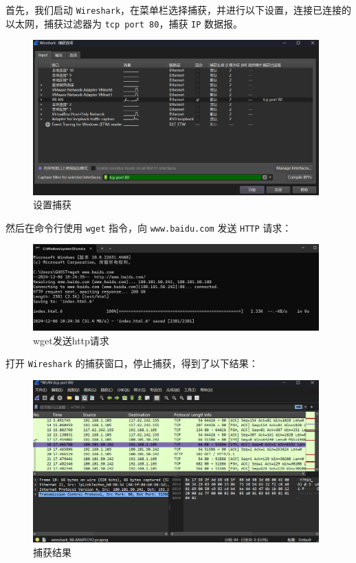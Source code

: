 \documentclass{article}
\begin{document}
	首先，我们启动 \texttt{Wireshark}，在菜单栏选择捕获，并进行以下设置，连接已连接的以太网，捕获过滤器为 \texttt{tcp port 80}，捕获 \texttt{IP} 数据报。
	
	\clearpage
	
	\begin{figure}[H]
		\centering
		\includegraphics[width=11cm]{images/1. 设置捕获.jpg}
		\caption{设置捕获}
	\end{figure}
	
	然后在命令行使用 \texttt{wget} 指令，向 \texttt{www.baidu.com} 发送 \texttt{HTTP} 请求：
	
	\begin{figure}[H]
		\centering
		\includegraphics[width=11cm]{images/2. wget发送http请求.png}
		\caption{wget发送http请求}
	\end{figure}
	
	打开 \texttt{Wireshark} 的捕获窗口，停止捕获，得到了以下结果：
	
	\begin{figure}[H]
		\centering
		\includegraphics[width=11cm]{images/3. 捕获结果.png}
		\caption{捕获结果}
	\end{figure}
	
\end{document}
